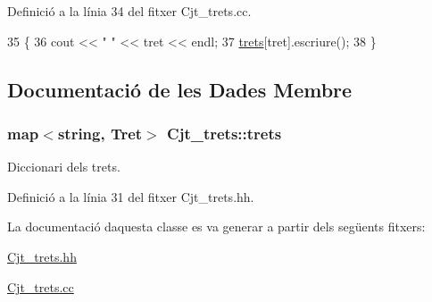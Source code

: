 Definició a la línia 34 del fitxer Cjt\+\_\+trets.\+cc.


\begin{DoxyCode}
35 \{
36   cout << \textcolor{stringliteral}{"  "} << tret << endl;
37   \hyperlink{class_cjt__trets_ab13190e3207e0e51bd78cf16b8ed5360}{trets}[tret].escriure();
38 \}
\end{DoxyCode}


\subsection{Documentació de les Dades Membre}
\subsubsection[{\texorpdfstring{trets}{trets}}]{\setlength{\rightskip}{0pt plus 5cm}map$<$string, {\bf Tret}$>$ Cjt\+\_\+trets\+::trets\hspace{0.3cm}{\ttfamily [private]}}\hypertarget{class_cjt__trets_ab13190e3207e0e51bd78cf16b8ed5360}{}\label{class_cjt__trets_ab13190e3207e0e51bd78cf16b8ed5360}


Diccionari dels trets. 



Definició a la línia 31 del fitxer Cjt\+\_\+trets.\+hh.



La documentació d\textquotesingle{}aquesta classe es va generar a partir dels següents fitxers\+:\begin{DoxyCompactItemize}
\item 
\hyperlink{_cjt__trets_8hh}{Cjt\+\_\+trets.\+hh}\item 
\hyperlink{_cjt__trets_8cc}{Cjt\+\_\+trets.\+cc}\end{DoxyCompactItemize}
